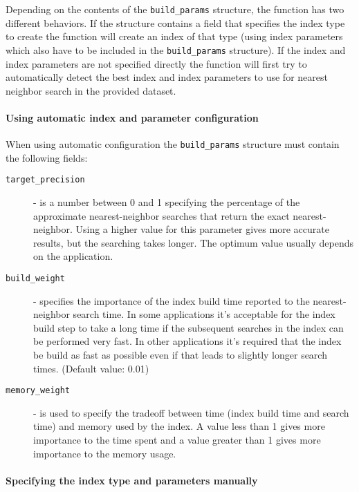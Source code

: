 \documentclass[letter,10pt]{article}
\begin{document}
Depending on the contents of the \texttt{build\_params} structure, the
function has two different behaviors. If the structure contains a field
that specifies the index type to create the function will create an index
of that type (using index parameters which also have to be included in
the \texttt{build\_params} structure). If the index and index parameters
are not specified directly the function will first try to automatically
detect the best index and index parameters to use for nearest neighbor
search in the provided dataset.

\paragraph{Using automatic index and parameter configuration}
When using automatic configuration the  \texttt{build\_params} structure
must contain the following fields:


\begin{description}

\item[\texttt{target\_precision}] - is a number between 0 and 1 specifying the
percentage of the approximate nearest-neighbor searches that return the
exact nearest-neighbor. Using a higher value for this parameter gives
more
accurate results, but the searching takes longer. The optimum value
usually
depends on the application.

\item[\texttt{build\_weight}] - specifies the importance of the
index build time reported to the nearest-neighbor search time. In some
applications it's acceptable for the index build step to take a long time
if the subsequent searches in the index can be performed very fast. In
other applications it's required that the index be build as fast as
possible even if that leads to slightly longer search times. (Default
value: 0.01)

\item[\texttt{memory\_weight}] - is used to specify the tradeoff between
time (index build time and search time) and memory used by the index. A
value less than 1 gives more importance to the time spent and a value
greater than 1 gives more importance to the memory usage.
 \end{description}


\paragraph{Specifying the index type and parameters manually}
\end{document}
